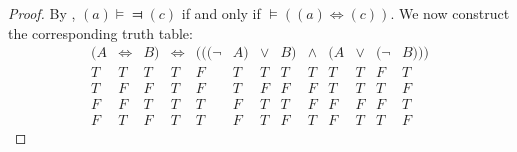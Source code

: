 \documentclass{report}
\begin{document}
\begin{proof}
      By , $(a) \vDash\Dashv (c)$ if and only if
        $\vDash ((a) \Leftrightarrow (c))$.
      We now construct the corresponding truth table:
        $$\begin{array}{s|c|s|e|c|s|c|s|c|s|c|c|s}
          (A & \Leftrightarrow & B) & \Leftrightarrow &
            (((\neg & A) & \lor & B) & \land & (A & \lor & (\neg & B))) \\
          \hline
          T & T & T & T & F & T & T & T & T & T & T & F & T \\
          T & F & F & T & F & T & F & F & F & T & T & T & F \\
          F & F & T & T & T & F & T & T & F & F & F & F & T \\
          F & T & F & T & T & F & T & F & T & F & T & T & F
        \end{array}$$

  \end{proof}
\end{document}
